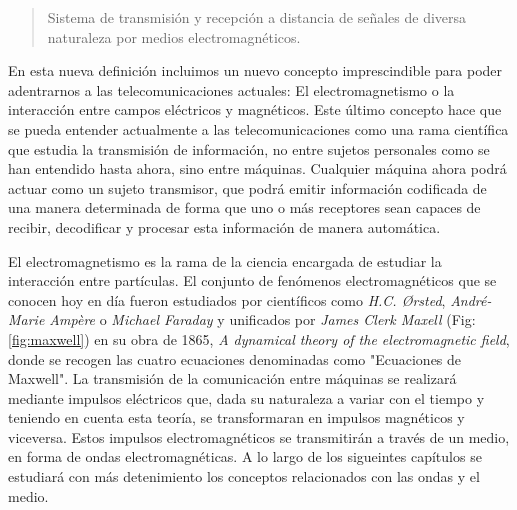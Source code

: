 \begin{quote}

\small Sistema de transmisión y recepción a distancia de señales de diversa naturaleza por medios electromagnéticos.

\end{quote}

\par En esta nueva definición incluimos un nuevo concepto imprescindible para poder adentrarnos a las telecomunicaciones actuales: El electromagnetismo o la interacción entre campos eléctricos y magnéticos. Este último concepto hace que se pueda entender actualmente a las telecomunicaciones como una rama científica que estudia la transmisión de información, no entre sujetos personales como se han entendido hasta ahora, sino entre máquinas. Cualquier máquina  ahora podrá actuar como un sujeto transmisor, que podrá emitir información codificada de una manera determinada de forma que uno o más receptores sean capaces de recibir, decodificar y procesar esta información de manera automática.
\\
\par El electromagnetismo es la rama de la ciencia encargada de estudiar la interacción entre partículas. El conjunto de fenómenos electromagnéticos que se conocen hoy en día fueron estudiados por científicos como \textit{H.C. Ørsted}, \textit{André-Marie Ampère} o \textit{Michael Faraday} y unificados por \textit{James Clerk Maxell} (Fig: \ref{fig:maxwell}) en su obra de 1865, \textit{A dynamical theory of the electromagnetic field}, donde se recogen las cuatro ecuaciones denominadas como "Ecuaciones de Maxwell". La transmisión de la comunicación entre máquinas se realizará mediante impulsos eléctricos que, dada su naturaleza a variar con el tiempo y teniendo en cuenta esta teoría, se transformaran en impulsos magnéticos y viceversa. Estos impulsos electromagnéticos se transmitirán a través de un medio, en forma de ondas electromagnéticas. A lo largo de los sigueintes capítulos se estudiará con más detenimiento los conceptos relacionados con las ondas y el medio.

